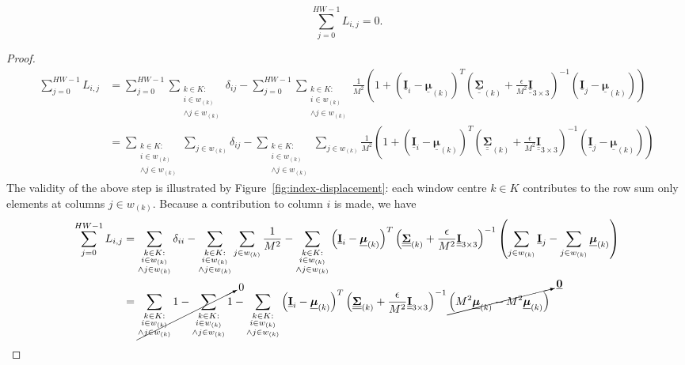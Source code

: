 \documentclass{article}
\def\vt#1{\underline{\mathbf{#1}}}
\def\vts#1{\underline{\boldsymbol{#1}}}
\def\mt#1{\underline{\underline{\mathbf{#1}}}}
\def\mts#1{\underline{\underline{\boldsymbol{#1}}}}
\begin{document}
\begin{lemma}\label{lemma3}
    $$\sum_{j=0}^{HW-1} L_{i,j} = 0.$$
    \begin{proof}
        \begin{align*}
            \sum_{j=0}^{HW-1} L_{i,j} &= \sum_{j=0}^{HW-1} \sum_{\substack{k\in K:\\i\in w_{(k)}\\ \wedge j\in w_{(k)}}} \delta_{ij} - \sum_{j=0}^{HW-1} \sum_{\substack{k\in K:\\i\in w_{(k)}\\ \wedge j\in w_{(k)}}} \frac1{M^2} \left(1 + \left(\vt{I}_i - \vts \mu_{(k)}\right)^T \left(\mts \Sigma_{(k)} + \frac\epsilon{M^2} \mt{I}_{3\times 3}\right)^{-1} \left(\vt{I}_j - \vts
            \mu_{(k)}\right) \right)\\
            &= \sum_{\substack{k\in K:\\i\in w_{(k)}\\ \wedge j\in w_{(k)}}} \sum_{j\in w_{(k)}} \delta_{ij} - \sum_{\substack{k\in K:\\i\in w_{(k)}\\ \wedge j\in w_{(k)}}} \sum_{j\in w_{(k)}} \frac1{M^2} \left(1 + \left(\vt{I}_i - \vts \mu_{(k)}\right)^T \left(\mts \Sigma_{(k)} + \frac\epsilon{M^2} \mt{I}_{3\times 3}\right)^{-1} \left(\vt{I}_j - \vts
            \mu_{(k)}\right) \right)
        \end{align*}
        The validity of the above step is illustrated by Figure~\ref{fig:index-displacement}: each window centre $k\in K$ contributes to the row sum only elements at columns $j\in w_{(k)}$. Because a contribution to column $i$ is made, we have
        \begin{align*}
            \sum_{j=0}^{HW-1} L_{i,j} &= \sum_{\substack{k\in K:\\i\in w_{(k)}\\ \wedge j\in w_{(k)}}} \delta_{ii} - \sum_{\substack{k\in K:\\i\in w_{(k)}\\ \wedge j\in w_{(k)}}} \sum_{j\in w_{(k)}} \frac1{M^2}  - \sum_{\substack{k\in K:\\i\in w_{(k)}\\ \wedge j\in w_{(k)}}} \left(\vt{I}_i - \vts \mu_{(k)}\right)^T \left(\mts \Sigma_{(k)} + \frac\epsilon{M^2} \mt{I}_{3\times 3}\right)^{-1}  \left(\sum_{j\in w_{(k)}} \vt{I}_j - \sum_{j\in w_{(k)}} \vts \mu_{(k)}\right)  \\
            &= \cancelto0{\sum_{\substack{k\in K:\\i\in w_{(k)}\\ \wedge j\in w_{(k)}}} 1 - \sum_{\substack{k\in K:\\i\in w_{(k)}\\ \wedge j\in w_{(k)}}} 1}  - \sum_{\substack{k\in K:\\i\in w_{(k)}\\ \wedge j\in w_{(k)}}} \left(\vt{I}_i - \vts \mu_{(k)}\right)^T \left(\mts \Sigma_{(k)} + \frac\epsilon{M^2} \mt{I}_{3\times 3}\right)^{-1}  \cancelto{\vt 0}{\left(M^2 \vts \mu_{(k)} - M^2 \vts \mu_{(k)}\right)}  \\

\end{align*}
\end{proof}
\end{lemma}
\end{document}

